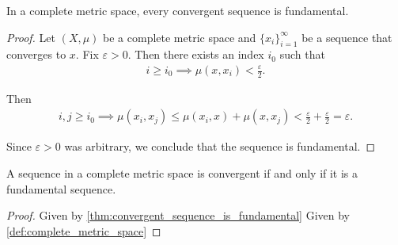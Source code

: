 \begin{proposition}\label{thm:convergent_sequence_is_fundamental}
  In a complete metric space, every convergent sequence is fundamental.
\end{proposition}
\begin{proof}
  Let \( (X, \mu) \) be a complete metric space and \( \{ x_i \}_{i=1}^\infty \) be a sequence that converges to \( x \). Fix \( \varepsilon > 0 \). Then there exists an index \( i_0 \) such that
  \begin{align*}
    i \geq i_0 \implies \mu(x, x_i) < \tfrac \varepsilon 2.
  \end{align*}

  Then
  \begin{align*}
    i, j \geq i_0 \implies \mu(x_i, x_j) \leq \mu(x_i, x) + \mu(x, x_j) < \tfrac \varepsilon 2 + \tfrac \varepsilon 2 = \varepsilon.
  \end{align*}

  Since \( \varepsilon > 0 \) was arbitrary, we conclude that the sequence is fundamental.
\end{proof}

\begin{corollary}\label{thm:cauchy_convergence_criterion}
  A sequence in a complete metric space is convergent if and only if it is a fundamental sequence.
\end{corollary}
\begin{proof}
  \Implies Given by \cref{thm:convergent_sequence_is_fundamental}
  \ImpliedBy Given by \cref{def:complete_metric_space}
\end{proof}

